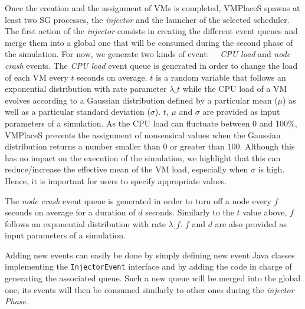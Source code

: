\documentclass[conference]{IEEEtran}
\newcommand{\sg}{SimGrid\xspace}
\newcommand{\vmps}{VMPlaceS\xspace}
\begin{document}
Once the creation and the assignment of VMs is completed, \vmps spawns
at least two SG processes, the \emph{injector} and the launcher of the
selected scheduler.  The first action of the \emph{injector} consists
in creating the different event queues and merge them into a global
one that will be consumed during the second phase of the simulation.
For now, we generate two kinds of event: ~~\emph{CPU load} and
\emph{node crash} events.
%
The \emph{CPU load} event queue is generated in order to change the
load of each VM every $t$ seconds on average. $t$ is a random variable
that follows an exponential distribution with rate parameter
$\lambda\_t$ while the CPU load of a VM evolves according to a
Gaussian distribution defined by a particular mean ($\mu$) as well as
a particular standard deviation ($\sigma$). $t$, $\mu$ and $\sigma$
are provided as input parameters of a simulation.  As the CPU load can
fluctuate between 0 and 100\%, \vmps prevents the assignment of
nonsensical values when the Gaussian distribution returns a number
smaller than 0 or greater than 100. Although this has no impact on the
execution of the simulation, we highlight that this can
reduce/increase the effective mean of the VM load, especially when
$\sigma$ is high.  Hence, it is important for users to specify
appropriate values.

The \emph{node crash} event queue is generated in order to turn off a
node every $f$ seconds on average for a duration of $d$ seconds.
Similarly to the $t$ value above, $f$ follows an exponential
distribution with rate $\lambda\_f$. $f$ and $d$ are also provided as
input parameters of a simulation.

Adding new events can easily be done by simply defining new event Java
classes implementing the \texttt{InjectorEvent} interface and by
adding the code in charge of generating the associated queue. Such a
new queue will be merged into the global one; its events will then be
consumed similarly to other ones during the \emph{injector Phase}.
\end{document}
